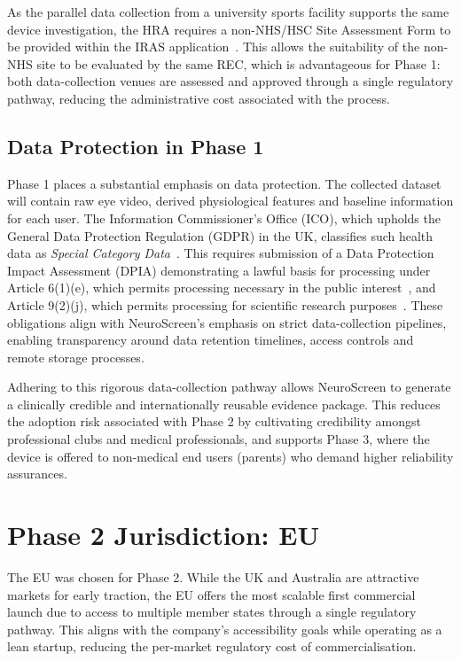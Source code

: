 As the parallel data collection from a university sports facility supports the same device investigation, the HRA requires a non-NHS/HSC Site Assessment Form to be provided within the IRAS application~\cite{hra_uk_governance}. This allows the suitability of the non-NHS site to be evaluated by the same REC, which is advantageous for Phase 1: both data-collection venues are assessed and approved through a single regulatory pathway, reducing the administrative cost associated with the process.

\subsection{Data Protection in Phase 1}

Phase 1 places a substantial emphasis on data protection. The collected dataset will contain raw eye video, derived physiological features and baseline information for each user. The Information Commissioner's Office (ICO), which upholds the General Data Protection Regulation (GDPR) in the UK, classifies such health data as \emph{Special Category Data}~\cite{ico_special_category}. This requires submission of a Data Protection Impact Assessment (DPIA) demonstrating a lawful basis for processing under Article 6(1)(e), which permits processing necessary in the public interest~\cite{gdpr_art6}, and Article 9(2)(j), which permits processing for scientific research purposes~\cite{gdpr_art9}. These obligations align with NeuroScreen's emphasis on strict data-collection pipelines, enabling transparency around data retention timelines, access controls and remote storage processes.

Adhering to this rigorous data-collection pathway allows NeuroScreen to generate a clinically credible and internationally reusable evidence package. This reduces the adoption risk associated with Phase 2 by cultivating credibility amongst professional clubs and medical professionals, and supports Phase 3, where the device is offered to non-medical end users (parents) who demand higher reliability assurances.


\section{Phase 2 Jurisdiction: EU}
\label{sec:ent-regulatory-eu}

The EU was chosen for Phase 2. While the UK and Australia are attractive markets for early traction, the EU offers the most scalable first commercial launch due to access to multiple member states through a single regulatory pathway. This aligns with the company's accessibility goals while operating as a lean startup, reducing the per-market regulatory cost of commercialisation.

